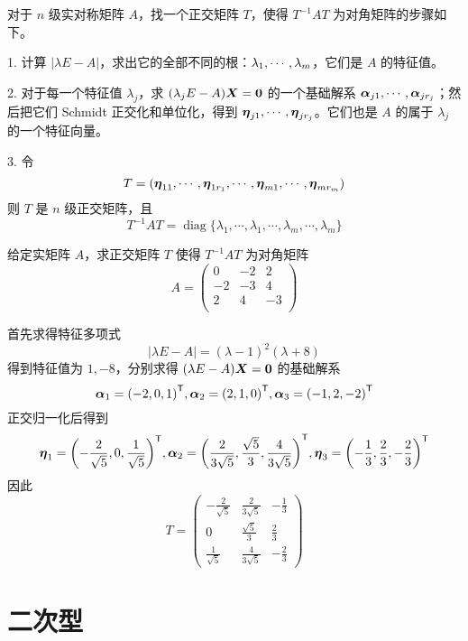 对于 $n$ 级实对称矩阵 $A$，找一个正交矩阵 $T$，使得 $T^{-1}AT$ 为对角矩阵的步骤如下。

1. 计算 $|\lambda E- A|$，求出它的全部不同的根：$\lambda_1,\cdots,\lambda_m$，它们是 $A$ 的特征值。

2. 对于每一个特征值 $\lambda_j$，求 $(\lambda_jE-A)\boldsymbol{X} = \boldsymbol{0}$ 的一个基础解系 $\boldsymbol{\alpha}_{j1},\cdots,\boldsymbol{\alpha}_{jr_j}$；然后把它们 Schmidt 正交化和单位化，得到 $\boldsymbol{\eta}_{j1},\cdots,\boldsymbol{\eta}_{jr_j}$。它们也是 $A$ 的属于 $\lambda_j$ 的一个特征向量。

3. 令
\[ T=(\boldsymbol{\eta}_{11},\cdots,\boldsymbol{\eta}_{1r_1},\cdots,\boldsymbol{\eta}_{m1},\cdots,\boldsymbol{\eta}_{mr_m}) \]
则 $T$ 是 $n$ 级正交矩阵，且
\[ T^{-1}AT = \operatorname{diag}\{\lambda_{1},\cdots,\lambda_{1},\cdots,\lambda_{m},\cdots,\lambda_{m}\} \]

\begin{example}
	给定实矩阵 $A$，求正交矩阵 $T$ 使得 $T^{-1}AT$ 为对角矩阵
	\[ A=\left(
		\begin{matrix}
				0  & -2 & 2  \\
				-2 & -3 & 4  \\
				2  & 4  & -3 \\
			\end{matrix}
		\right) \]
\end{example}

\begin{solution}
	首先求得特征多项式
	\[ |\lambda E - A| = (\lambda-1)^2(\lambda+8) \]
	得到特征值为 $1, -8$，分别求得 $(\lambda E - A) \boldsymbol{X} = \boldsymbol{0}$ 的基础解系
	\[ \boldsymbol{\alpha}_1 = {(-2, 0, 1)}^\mathsf{T}, \boldsymbol{\alpha}_2 = {(2, 1, 0)}^\mathsf{T}, \boldsymbol{\alpha}_3 = {(-1, 2, -2)}^\mathsf{T} \]
	正交归一化后得到
	\[ \boldsymbol{\eta}_1 = {\left(-\frac{2}{\sqrt{5}}, 0, \frac{1}{\sqrt{5}}\right)}^\mathsf{T}, \boldsymbol{\alpha}_2 = {\left(\frac{2}{3\sqrt{5}}, \frac{\sqrt{5}}{3}, \frac{4}{3 \sqrt{5}}\right)}^\mathsf{T}, \boldsymbol{\eta}_3 = {\left(-\frac{1}{3}, \frac{2}{3}, -\frac{2}{3}\right)}^\mathsf{T} \]
	因此
	\[ T = \left(\begin{matrix}
				-\frac{2}{\sqrt{5}} & \frac{2}{3\sqrt{5}}  & -\frac{1}{3} \\
				0                   & \frac{\sqrt{5}}{3}   & \frac{2}{3}  \\
				\frac{1}{\sqrt{5}}  & \frac{4}{3 \sqrt{5}} & -\frac{2}{3}
			\end{matrix}\right) \]
\end{solution}

\section{二次型}

